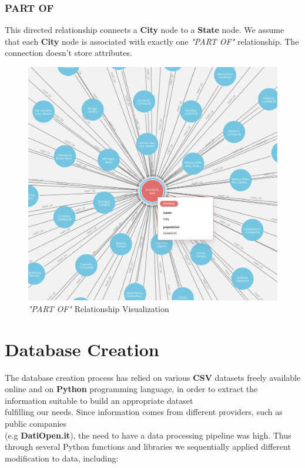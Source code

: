 \documentclass{article}[IEEEtran]
\begin{document}
\subsubsection{PART OF}

This directed relationship connects a \textbf{City} node to a \textbf{State} node. We assume that each \textbf{City} node is associated with exactly one \emph{"PART OF"} relationship. The connection doesn't store attributes.

\begin{figure}[H]
\begin{center}
\includegraphics[width=0.65\linewidth, frame]{PART_OF.png}
\caption{\emph{"PART OF"} Relationship Visualization}
\end{center}
\end{figure}



\section{Database Creation}\label{db}
The database creation process has relied on various \textbf{CSV} datasets freely available online and on \textbf{Python}\cite{van1995python} programming language, in order to extract the information suitable to build an appropriate dataset \\ fulfilling our needs. Since information comes from different providers, such as public companies \\ (e.g \textbf{DatiOpen.it}), the need to have a data processing pipeline was high.
Thus through several Python functions and libraries we sequentially applied different modification to data, including:
\end{document}
